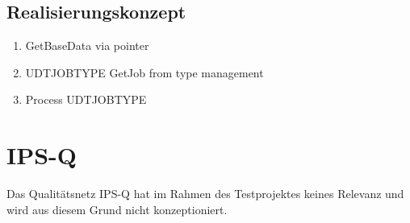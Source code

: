 
\subsection{Realisierungskonzept}
\label{subsec:ips_l_concept}

\begin{enumerate}
    \item GetBaseData via pointer
    \item UDTJOBTYPE  GetJob from type management
    \item Process UDTJOBTYPE
\end{enumerate}


\section{IPS-Q}
\label{sec:ips_q}

Das Qualitätsnetz IPS-Q hat im Rahmen des Testprojektes keines Relevanz und wird aus diesem Grund nicht konzeptioniert.